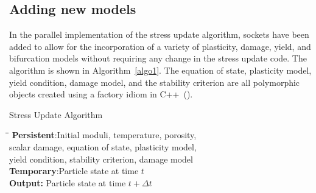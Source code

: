 \subsection{Adding new models}
  In the parallel implementation of the stress update algorithm, sockets have 
  been added to allow for the incorporation of a variety of plasticity, damage, 
  yield, and bifurcation models without requiring any change in the stress 
  update code.  The algorithm is shown in Algorithm~\ref{algo1}.  The
  equation of state, plasticity model, yield condition, damage model, and
  the stability criterion are all polymorphic objects created using a 
  factory idiom in C++~(\cite{Coplien92}).
  \begin{table}[p]
    \caption{Stress Update Algorithm} \label{algo1}
    \vspace{12pt}
    \begin{tabbing}
    \quad \=\quad \=\quad \=\quad \=\quad \kill
    {\bf Persistent}:Initial moduli, temperature, porosity, \\
      \>\>        scalar damage, equation of state, plasticity model, \\
      \>\>        yield condition, stability criterion, damage model\\
    {\bf Temporary}:Particle state at time $t$ \\
    {\bf Output:} Particle state at time $t+\Delta t$\\ \\


\end{tabbing}
\end{table}
